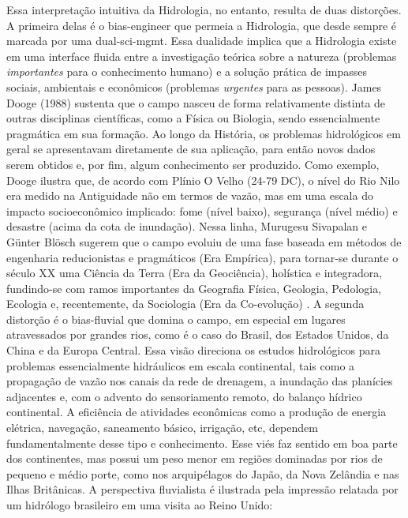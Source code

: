 \documentclass[./main.tex]{subfiles}
\begin{document}
\par Essa interpretação intuitiva da Hidrologia, no entanto, resulta de duas distorções. A primeira delas é o \gls{bias-engineer} que permeia a Hidrologia, que desde sempre é marcada por uma \gls{dual-sci-mgmt}. Essa dualidade implica que a Hidrologia existe em uma interface fluida entre a investigação teórica sobre a natureza (problemas \textit{importantes} para o conhecimento humano) e a solução prática de impasses sociais, ambientais e econômicos (problemas \textit{urgentes} para as pessoas). 
James Dooge (1988) \cite{Dooge1988} sustenta que o campo nasceu de forma relativamente distinta de outras disciplinas científicas, como a Física ou Biologia, sendo essencialmente pragmática em sua formação. Ao longo da História, os problemas hidrológicos em geral se apresentavam diretamente de sua aplicação, para então novos dados serem obtidos e, por fim, algum conhecimento ser produzido. Como exemplo, Dooge ilustra que, de acordo com Plínio O Velho (24-79 DC), o nível do Rio Nilo era medido na Antiguidade não em termos de vazão, mas em uma escala do impacto socioeconômico implicado: fome (nível baixo), segurança (nível médio) e desastre (acima da cota de inundação). Nessa linha, Murugesu Sivapalan e Günter Blösch sugerem que o campo evoluiu de uma fase baseada em métodos de engenharia reducionistas e pragmáticos (Era Empírica), para tornar-se durante o século XX uma Ciência da Terra (Era da Geociência), holística e integradora, fundindo-se com ramos importantes da Geografia Física, Geologia, Pedologia, Ecologia e, recentemente, da Sociologia (Era da Co-evolução) \cite{Sivapalan2017, Sivapalan2018}. A segunda distorção é o \gls{bias-fluvial} que domina o campo, em especial em lugares atravessados por grandes rios, como é o caso do Brasil, dos Estados Unidos, da China e da Europa Central. Essa visão direciona os estudos hidrológicos para problemas essencialmente hidráulicos em escala continental, tais como a propagação de vazão nos canais da rede de drenagem, a inundação das planícies adjacentes e, com o advento do sensoriamento remoto, do balanço hídrico continental. A eficiência de atividades econômicas como a produção de energia elétrica, navegação, saneamento básico, irrigação, etc, dependem fundamentalmente desse tipo e conhecimento. Esse viés faz sentido em boa parte dos continentes, mas possui um peso menor em regiões dominadas por rios de pequeno e médio porte, como nos arquipélagos do Japão, da Nova Zelândia e nas Ilhas Britânicas. A perspectiva fluvialista é ilustrada pela impressão relatada por um hidrólogo brasileiro em uma visita ao Reino Unido:
\end{document}
